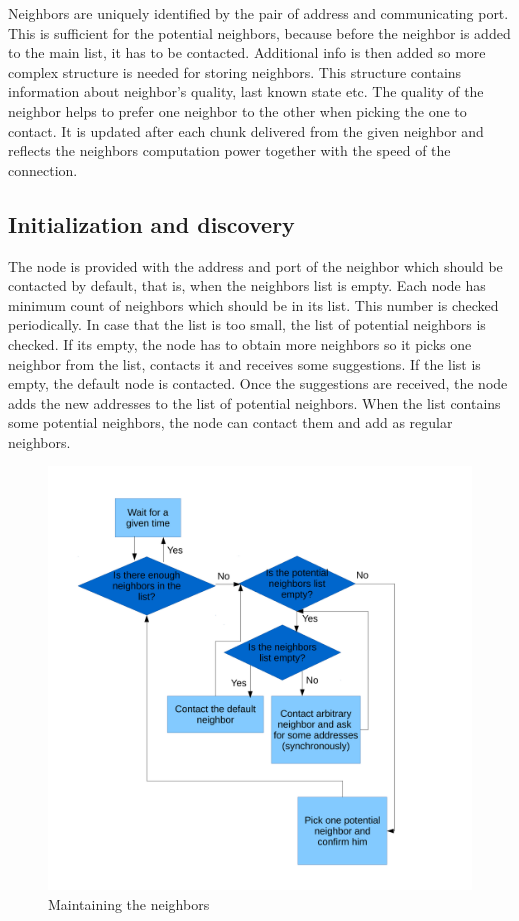 Neighbors are uniquely identified by the pair of address and
communicating port. This is sufficient for the potential neighbors,
because before the neighbor is added to the main list, it has to be
contacted. Additional info is then added so more complex structure is
needed for storing neighbors. This structure contains information about
neighbor's quality, last known state etc. The quality of the neighbor
helps to prefer one neighbor to the other when picking the one to
contact. It is updated after each chunk delivered from the given
neighbor and reflects the neighbors computation power together with the
speed of the connection.

\subsection*{Initialization and discovery}

The node is provided with the address and port of the neighbor which
should be contacted by default, that is, when the neighbors list is
empty. Each node has minimum count of neighbors which should be in its
list. This number is checked periodically. In case that the list is too
small, the list of potential neighbors is checked. If its empty, the
node has to obtain more neighbors so it picks one neighbor from the
list, contacts it and receives some suggestions. If the list is empty,
the default node is contacted. Once the suggestions are received, the
node adds the new addresses to the list of potential neighbors. When the
list contains some potential neighbors, the node can contact them and
add as regular neighbors.

\begin{figure}[h]
\begin{center}
\includegraphics[scale=0.40]{./img/workflow_neighbors.pdf}
\caption{Maintaining the neighbors}
\end{center}
\end{figure}


